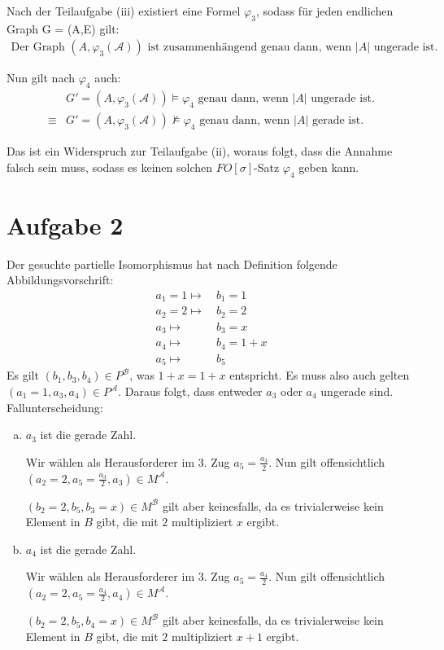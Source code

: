 \documentclass[a4paper,10pt]{article}
\begin{document}
\begin{enumerate}[(i)]
			Nach der Teilaufgabe (iii) existiert eine Formel $\varphi_3$, sodass für jeden 				endlichen Graph G = (A,E) gilt:
			\begin{align*}
				\text{Der Graph } (A, \varphi_3(\mathcal{A})) \text{ ist zusammenhängend genau dann, wenn $|A|$ ungerade ist.}
			\end{align*}
			
			Nun gilt nach $\varphi_4$ auch:
			\begin{align*}
				&G' = (A,\varphi_3(\mathcal{A})) \vDash \varphi_4 \text{ genau dann, wenn $|A|$ ungerade ist.} \\
				\equiv%
				&G' = (A,\varphi_3(\mathcal{A})) \nvDash \varphi_4 \text{ genau dann, wenn $|A|$ gerade ist.} 
			\end{align*}
			
			Das ist ein Widerspruch zur Teilaufgabe (ii), woraus folgt, dass die Annahme falsch sein muss, sodass es keinen solchen 							$FO[\sigma]$-Satz $\varphi_4$ geben kann.
	\end{enumerate}
\section*{Aufgabe 2}
Der gesuchte partielle Isomorphismus hat nach Definition folgende Abbildungsvorschrift:
\begin{align*}
a_1 = 1 \mapsto & ~ b_1 = 1 \\
a_2 = 2 \mapsto &  ~ b_2 = 2 \\
a_3 \mapsto & ~ b_3 = x \\
a_4 \mapsto & ~ b_4 = 1 + x \\
a_5 \mapsto & ~ b_5
\end{align*}
Es gilt $\left(b_1,b_3,b_4\right) \in P^{\mathcal B}$, was $1 + x = 1 + x$ entspricht.
Es muss also auch gelten $\left(a_1 = 1,a_3,a_4\right) \in P^{\mathcal A}$. Daraus folgt, dass entweder $a_3$ oder $a_4$ ungerade sind.\\

Fallunterscheidung:
\begin{enumerate}[(a)]
\item $a_3$ ist die gerade Zahl.

Wir wählen als Herausforderer im 3. Zug $a_5 = \frac{a_3}{2}$.
Nun gilt offensichtlich $\left(a_2 = 2,a_5 = \frac{a_3}{2},a_3\right) \in M^{\mathcal A}$.

$\left(b_2 = 2,b_5,b_3 = x\right) \in M^{\mathcal B}$ gilt aber keinesfalls, da es trivialerweise kein Element in $B$ gibt, die mit $2$ multipliziert $x$ ergibt.
\item $a_4$ ist die gerade Zahl.

Wir wählen als Herausforderer im 3. Zug $a_5 = \frac{a_4}{2}$.
Nun gilt offensichtlich $\left(a_2 = 2,a_5 = \frac{a_4}{2},a_4\right) \in M^{\mathcal A}$.

$\left(b_2 = 2,b_5,b_4 = x\right) \in M^{\mathcal B}$ gilt aber keinesfalls, da es trivialerweise kein Element in $B$ gibt, die mit $2$ multipliziert $x + 1$ ergibt.
\end{enumerate}
\end{document}
